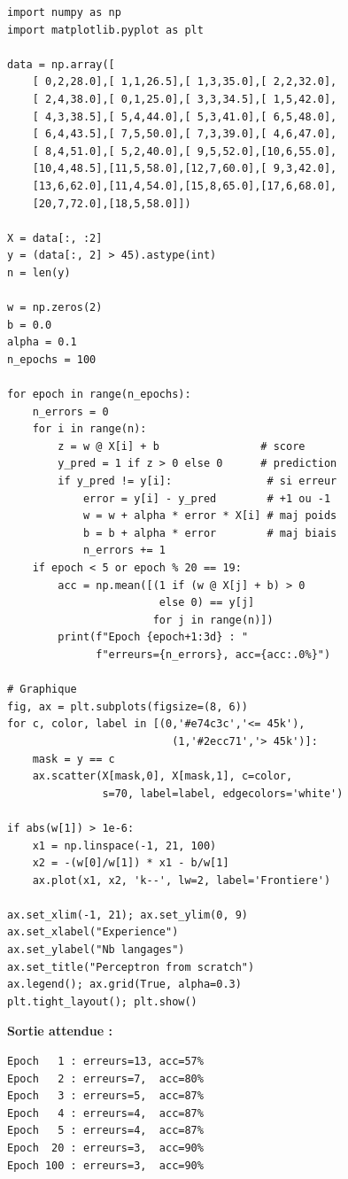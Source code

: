 \begin{pythonbox}
\begin{lstlisting}
import numpy as np
import matplotlib.pyplot as plt

data = np.array([
    [ 0,2,28.0],[ 1,1,26.5],[ 1,3,35.0],[ 2,2,32.0],
    [ 2,4,38.0],[ 0,1,25.0],[ 3,3,34.5],[ 1,5,42.0],
    [ 4,3,38.5],[ 5,4,44.0],[ 5,3,41.0],[ 6,5,48.0],
    [ 6,4,43.5],[ 7,5,50.0],[ 7,3,39.0],[ 4,6,47.0],
    [ 8,4,51.0],[ 5,2,40.0],[ 9,5,52.0],[10,6,55.0],
    [10,4,48.5],[11,5,58.0],[12,7,60.0],[ 9,3,42.0],
    [13,6,62.0],[11,4,54.0],[15,8,65.0],[17,6,68.0],
    [20,7,72.0],[18,5,58.0]])

X = data[:, :2]
y = (data[:, 2] > 45).astype(int)
n = len(y)

w = np.zeros(2)
b = 0.0
alpha = 0.1
n_epochs = 100

for epoch in range(n_epochs):
    n_errors = 0
    for i in range(n):
        z = w @ X[i] + b                # score
        y_pred = 1 if z > 0 else 0      # prediction
        if y_pred != y[i]:               # si erreur
            error = y[i] - y_pred        # +1 ou -1
            w = w + alpha * error * X[i] # maj poids
            b = b + alpha * error        # maj biais
            n_errors += 1
    if epoch < 5 or epoch % 20 == 19:
        acc = np.mean([(1 if (w @ X[j] + b) > 0
                        else 0) == y[j]
                       for j in range(n)])
        print(f"Epoch {epoch+1:3d} : "
              f"erreurs={n_errors}, acc={acc:.0%}")

# Graphique
fig, ax = plt.subplots(figsize=(8, 6))
for c, color, label in [(0,'#e74c3c','<= 45k'),
                          (1,'#2ecc71','> 45k')]:
    mask = y == c
    ax.scatter(X[mask,0], X[mask,1], c=color,
               s=70, label=label, edgecolors='white')

if abs(w[1]) > 1e-6:
    x1 = np.linspace(-1, 21, 100)
    x2 = -(w[0]/w[1]) * x1 - b/w[1]
    ax.plot(x1, x2, 'k--', lw=2, label='Frontiere')

ax.set_xlim(-1, 21); ax.set_ylim(0, 9)
ax.set_xlabel("Experience")
ax.set_ylabel("Nb langages")
ax.set_title("Perceptron from scratch")
ax.legend(); ax.grid(True, alpha=0.3)
plt.tight_layout(); plt.show()
\end{lstlisting}
\end{pythonbox}

\textbf{Sortie attendue :}
\begin{verbatim}
Epoch   1 : erreurs=13, acc=57%
Epoch   2 : erreurs=7,  acc=80%
Epoch   3 : erreurs=5,  acc=87%
Epoch   4 : erreurs=4,  acc=87%
Epoch   5 : erreurs=4,  acc=87%
Epoch  20 : erreurs=3,  acc=90%
Epoch 100 : erreurs=3,  acc=90%
\end{verbatim}

